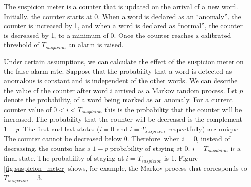 \documentclass[compsoc,conference,a4paper]{IEEEtran}
\begin{document}
  The suspicion meter is a counter that is updated on the arrival of a new word. Initially, the counter starts at 0. When a word is declared as an ``anomaly'', the counter is increased by 1, and when a word is declared as ``normal'', the counter is decreased by 1, to a minimum of 0. Once the counter reaches a calibrated threshold of $T_{suspicion}$ an alarm is raised.
  
  Under certain assumptions, we can calculate the effect of the suspicion meter on the false alarm rate. Suppose that the probability that a word is detected as anomalous is constant and is independent of the other words. We can describe the value of the counter after word $i$ arrived as a Markov random process. Let $p$ denote the probability, of a word being marked as an anomaly. For a current counter value of $0 < i < T_{suspicion}$ this is the probability that the counter will be increased. The probability that the counter will be decreased is the complement $1 - p$. The first and last states ($i = 0$ and $i = T_{suspicion}$ respectfully) are unique. The counter cannot be decreased below 0. Therefore, when $i = 0$, instead of decreasing, the counter has a $1 - p$ probability of staying at 0. $i = T_{suspicion}$ is a final state. The probability of staying at $i = T_{suspicion}$ is 1. Figure \ref{fig:suspicion_meter} shows, for example, the Markov process that corresponds to $T_{suspicion} = 3$.
  
\end{document}
